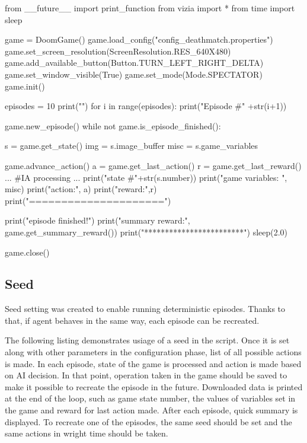 \begin{pblock}
from __future__ import print_function
from vizia import *
from time import sleep

game = DoomGame()
game.load_config("config_deathmatch.properties")
game.set_screen_resolution(ScreenResolution.RES_640X480)
game.add_available_button(Button.TURN_LEFT_RIGHT_DELTA)
game.set_window_visible(True)
game.set_mode(Mode.SPECTATOR)
game.init()

episodes = 10
print("")
for i in range(episodes):
	print("Episode #" +str(i+1))
	
	game.new_episode()
	while not game.is_episode_finished():
		
		s = game.get_state()
		img = s.image_buffer
		misc = s.game_variables

		game.advance_action()
		a = game.get_last_action()
		r = game.get_last_reward()
		...		
		#IA processing
		...
		print("state #"+str(s.number))
		print("game variables: ", misc)
		print("action:", a)
		print("reward:",r)
		print("=====================")

	
	print("episode finished!")
	print("summary reward:", game.get_summary_reward())
	print("************************")
	sleep(2.0)

game.close()
\end{pblock}

\subsection {Seed}
Seed setting was created to enable running deterministic episodes. Thanks to that, if agent behaves in the same way, each episode can be recreated.

The following listing demonstrates usiage of a seed in the script. Once it is set along with other parameters in the configuration phase, list of all possible actions is made. In each episode, state of the game is processed and action is made based on AI decision. In that point, operation taken in the game should be saved to make it possible to recreate the episode in the future. Downloaded data is printed at the end of the loop, such as game state number, the values of variables set in the game and reward for last action made. After each episode, quick summary is displayed. To recreate one of the episodes, the same seed should be set and the same actions in wright time should be taken.

